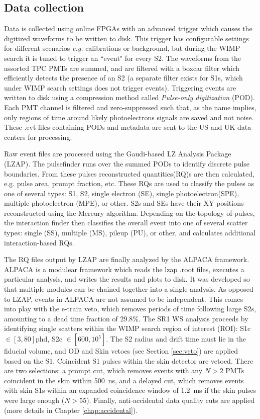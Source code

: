 \subsection{Data collection}
Data is collected using online FPGAs with an advanced trigger which causes the digitized waveforms to be written to disk.
This trigger has configurable settings for different scenarios \textit{e.g.} calibrations or background, but during the WIMP search it is tuned to trigger an ``event" for every S2.
The waveforms from the assorted TPC PMTs are summed, and are filtered with a boxcar filter which efficiently detects the presence of an S2 (a separate filter exists for S1s, which under WIMP search settings does not trigger events).
Triggering events are written to disk using a compression method called \textit{Pulse-only digitization} (POD).
Each PMT channel is filtered and zero-suppressed such that, as the name implies, only regions of time around likely photoelectrons signals are saved and not noise.
These .evt files containing PODs and metadata are sent to the US and UK data centers for processing.

Raw event files are processed using the Gaudi-based LZ Analysis Package (LZAP).
The pulsefinder runs over the summed PODs to identify discrete pulse boundaries.
From these pulses reconstructed quantities(RQ)s are then calculated, e.g. pulse area, prompt fraction,  etc.
These RQs are used to classify the pulses as one of several types: S1, S2, single electron (SE), single photoelectron(SPE), multiple photoelectron (MPE), or other.
S2s and SEs have their XY positions reconstructed using the Mercury algorithm.
Depending on the topology of pulses, the interaction finder then classifies the overall event into one of several scatter types: single (SS), multiple (MS), pileup (PU), or other, and calculates additional interaction-based RQs.

The RQ files output by LZAP are finally analyzed by the ALPACA framework.
ALPACA is a modulear framework which reads the lzap .root files, executes a particular analysis, and writes the results and plots to disk.
It was developed so that multiple modules can be chained together into a single analysis.
As opposed to LZAP, events in ALPACA are not assumed to be independent.
This comes into play with the e-train veto, which removes periods of time following large S2s, amounting to a dead time fraction of 29.8\%.
The SR1 WS analysis proceeds by identifying single scatters within the WIMP search region of interest (ROI): S1c $\in [3,80]$phd, S2c $\in [600, 10^5]$.
The S2 radius and drift time must lie in the fiducial volume, and OD and  Skin vetoes (see Section \ref{sec:veto}) are applied based on the S1.
Coincident S1 pulses within the skin detector are vetoed.
There are two selections: a prompt cut, which removes events with any $N>2$ PMTs coincident in the skin within 500~ns, and a delayed cut, which removes events with skin S1s within an expanded coincidence window of 1.2~ms if the skin pulses were large enough ($N>55$).
Finally, anti-accidental data quality cuts are applied (more details in Chapter \ref{chap:accidental}).

